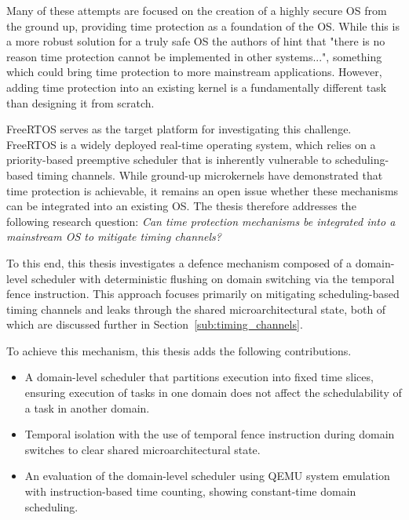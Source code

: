 Many of these attempts are focused on the creation of a highly secure OS from
the ground up, providing time protection as a foundation of the OS. While this
is a more robust solution for a truly safe OS the authors of \cite{ge2019} hint
that "there is no reason time protection cannot be implemented in other
systems...", something which could bring time protection to more mainstream
applications. However, adding time protection into an existing kernel is a
fundamentally different task than designing it from scratch.

FreeRTOS serves as the target platform for investigating this challenge.
FreeRTOS is a widely deployed real-time operating system, which relies on a
priority-based preemptive scheduler that is inherently vulnerable to
scheduling-based timing channels. While ground-up microkernels have
demonstrated that time protection is achievable, it remains an open issue
whether these mechanisms can be integrated into an existing OS. The thesis
therefore addresses the following research question: \emph{Can time protection
mechanisms be integrated into a mainstream OS to mitigate timing channels?}

To this end, this thesis investigates a defence mechanism composed of a
domain-level scheduler with deterministic flushing on domain switching via the
temporal fence instruction. This approach focuses primarily on mitigating
scheduling-based timing channels and leaks through the shared
microarchitectural state, both of which are discussed further in
Section~\ref{sub:timing_channels}.

To achieve this mechanism, this thesis adds the following contributions.
\begin{itemize}
  \item A domain-level scheduler that partitions execution into fixed time
    slices, ensuring execution of tasks in one domain does not affect the
    schedulability of a task in another domain.
  \item Temporal isolation with the use of temporal fence instruction during
    domain switches to clear shared microarchitectural state.
  \item An evaluation of the domain-level scheduler using QEMU system emulation
    with instruction-based time counting, showing constant-time domain
    scheduling.
\end{itemize}

